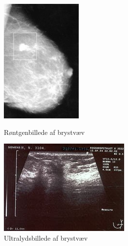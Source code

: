 \begin{figure}[H]
  \centering
  \begin{minipage}{0.4\textwidth}
    \includegraphics[width=\textwidth]{figurer/r/rontgen}
    \caption{Røntgenbillede af brystvæv \cite{Mammografi}}
    \label{rontgen}
  \end{minipage}
  \hfill
  \begin{minipage}{0.4\textwidth}
    \includegraphics[width=\textwidth]{figurer/r/ultra}
    \caption{Ultralydsbillede af brystvæv \cite{Ultralyd}}
    \label{ultralyd}
  \end{minipage}
\end{figure}

